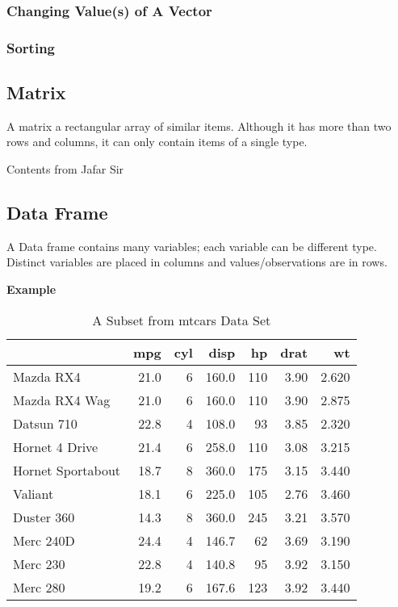 \documentclass[
]{book}
\begin{document}
\hypertarget{changing-values-of-a-vector}{%
\subsubsection{Changing Value(s) of A Vector}\label{changing-values-of-a-vector}}

\hypertarget{sorting}{%
\subsubsection{Sorting}\label{sorting}}

\hypertarget{matrix}{%
\subsection{Matrix}\label{matrix}}

A matrix a rectangular array of similar items. Although it has more than two rows and columns, it can only contain items of a single type.

{Contents from Jafar Sir}

\hypertarget{data-frame}{%
\subsection{Data Frame}\label{data-frame}}

A Data frame contains many variables; each variable can be different type. Distinct variables are placed in columns and values/observations are in rows.

\textbf{Example}

\begin{table}

\caption{\label{tab:unnamed-chunk-11}A Subset from mtcars Data Set}
\centering
\begin{tabular}[t]{l|r|r|r|r|r|r}
\hline
  & mpg & cyl & disp & hp & drat & wt\\
\hline
Mazda RX4 & 21.0 & 6 & 160.0 & 110 & 3.90 & 2.620\\
\hline
Mazda RX4 Wag & 21.0 & 6 & 160.0 & 110 & 3.90 & 2.875\\
\hline
Datsun 710 & 22.8 & 4 & 108.0 & 93 & 3.85 & 2.320\\
\hline
Hornet 4 Drive & 21.4 & 6 & 258.0 & 110 & 3.08 & 3.215\\
\hline
Hornet Sportabout & 18.7 & 8 & 360.0 & 175 & 3.15 & 3.440\\
\hline
Valiant & 18.1 & 6 & 225.0 & 105 & 2.76 & 3.460\\
\hline
Duster 360 & 14.3 & 8 & 360.0 & 245 & 3.21 & 3.570\\
\hline
Merc 240D & 24.4 & 4 & 146.7 & 62 & 3.69 & 3.190\\
\hline
Merc 230 & 22.8 & 4 & 140.8 & 95 & 3.92 & 3.150\\
\hline
Merc 280 & 19.2 & 6 & 167.6 & 123 & 3.92 & 3.440\\
\hline
\end{tabular}
\end{table}
\end{document}
